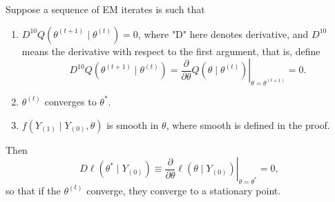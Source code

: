 \begin{theorem}
    Suppose a sequence of EM iterates is such that
    \begin{enumerate}
        \item $D^{10} Q\left(\theta^{(t+1)} \mid \theta^{(t)}\right)=0$, where "D" here denotes derivative, and $D^{10}$ means the derivative with respect to the first argument, that is, define
              \begin{equation}
                  D^{10} Q\left(\theta^{(t+1)}\mid\theta^{(t)}\right)=\left.\frac{\partial}{\partial \theta} Q\left(\theta \mid \theta^{(t)}\right)\right|_{\theta=\theta^{(t+1)}}=0.
              \end{equation}
        \item $\theta^{(t)}$ converges to $\theta^{*}$.
        \item $f\left(Y_{(1)} \mid Y_{(0)}, \theta\right)$ is smooth in $\theta$, where smooth is defined in the proof.
    \end{enumerate}
    Then
    \begin{equation}
        \left.D \ell\left(\theta^{*} \mid Y_{(0)}\right) \equiv \frac{\partial}{\partial \theta} \ell\left(\theta \mid Y_{(0)}\right)\right|_{\theta=\theta^{*}}=0,
    \end{equation}
    so that if the $\theta^{(t)}$ converge, they converge to a stationary point.
\end{theorem}

